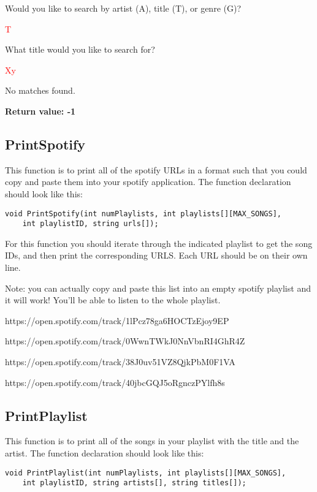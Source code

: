 \begin{sample}
Would you like to search by artist (A), title (T), or genre (G)?

\textcolor{red}{T}

What title would you like to search for?

\textcolor{red}{Xy}

No matches found.

\textbf{Return value: -1}
\end{sample}

\subsection{PrintSpotify \star}
This function is to print all of the spotify URLs in a format such that you could copy and paste them into your spotify application. The function declaration should look like this:

\begin{verbatim}
void PrintSpotify(int numPlaylists, int playlists[][MAX_SONGS], 
    int playlistID, string urls[]);
\end{verbatim}

For this function you should iterate through the indicated playlist to get the song IDs, and then print the corresponding URLS. Each URL should be on their own line. 

Note: you can actually copy and paste this list into an empty spotify playlist and it will work! You'll be able to listen to the whole playlist. 

\begin{sample}
https://open.spotify.com/track/1lPcz78ga6HOCTzEjoy9EP

https://open.spotify.com/track/0WwnTWkJ0NnVbnRI4GhR4Z

https://open.spotify.com/track/38J0uv51VZ8QjkPbM0F1VA

https://open.spotify.com/track/40jbcGQJ5oRgnczPYlfh8s
\end{sample}

\subsection{PrintPlaylist \star}
This function is to print all of the songs in your playlist with the title and the artist. The function declaration should look like this:

\begin{verbatim}
void PrintPlaylist(int numPlaylists, int playlists[][MAX_SONGS], 
    int playlistID, string artists[], string titles[]);
\end{verbatim}

